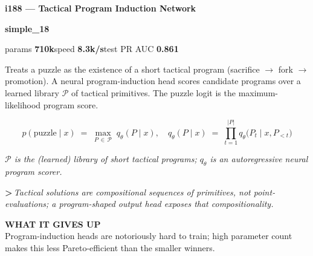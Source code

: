 \documentclass[10pt,a4paper]{article}
\newcommand{\pillsi}[0]{\colorbox{s18redbg}{\strut\textcolor{s18red}{\scriptsize\bfseries\sffamily simple\_18}}}
\begin{document}
\begin{tcolorbox}
\begin{tcolorbox}[archhead, boxsep=0pt, top=4pt, bottom=4pt]
\textcolor{deepforest}{\sffamily\bfseries\large i188 --- Tactical Program Induction Network}\\[2pt]
\textcolor{muted}{\sffamily\scriptsize \pillsi{}\quad params \textbf{710k}\quad speed \textbf{8.3k/s}\quad test PR AUC \textbf{0.861}}
\end{tcolorbox}
\smallskip
Treats a puzzle as the existence of a short tactical program (sacrifice $\to$ fork $\to$ promotion). A neural program-induction head scores candidate programs over a learned library $\mathcal{P}$ of tactical primitives. The puzzle logit is the maximum-likelihood program score.
\par\smallskip
\begin{equation*}
p(\text{puzzle} \mid x) \;=\; \max_{P\,\in\,\mathcal{P}}\; q_\theta(P \mid x), \quad q_\theta(P \mid x) \;=\; \prod_{t=1}^{|P|} q_\theta\!\bigl(P_t \mid x, P_{<t}\bigr)
\end{equation*}
\par\vspace{-4pt}\begin{center}\textit{\textcolor{muted}{\small $\mathcal{P}$ is the (learned) library of short tactical programs; $q_\theta$ is an autoregressive neural program scorer.}}\end{center}
\par\smallskip
{\color{forest}\sffamily\bfseries\textgreater\,}\textit{Tactical solutions are \emph{compositional sequences of primitives}, not point-evaluations; a program-shaped output head exposes that compositionality.}
\par\smallskip\textbf{\sffamily\footnotesize\color{muted}WHAT IT GIVES UP}\\
Program-induction heads are notoriously hard to train; high parameter count makes this less Pareto-efficient than the smaller winners.
\end{tcolorbox}
\end{document}
